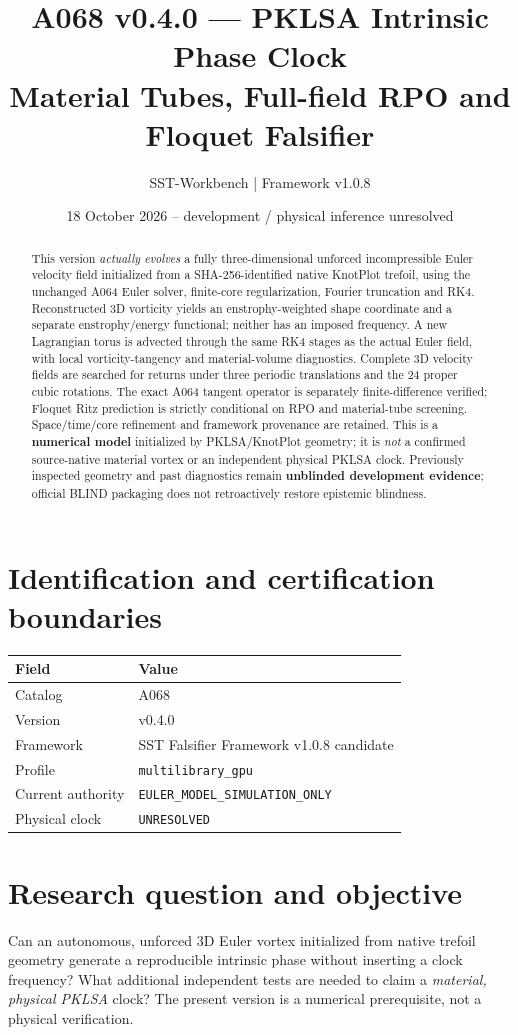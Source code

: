 \documentclass[11pt,a4paper]{article}
\title{A068 v0.4.0 --- PKLSA Intrinsic Phase Clock\\Material Tubes, Full-field RPO and Floquet Falsifier}
\author{SST-Workbench | Framework v1.0.8}
\date{18 October 2026 -- development / physical inference unresolved}
\begin{document}
\maketitle
\begin{abstract}
This version \emph{actually evolves} a fully three-dimensional unforced incompressible Euler velocity field initialized from a SHA-256-identified native KnotPlot trefoil, using the unchanged A064 Euler solver, finite-core regularization, Fourier truncation and RK4. Reconstructed 3D vorticity yields an enstrophy-weighted shape coordinate and a separate enstrophy/energy functional; neither has an imposed frequency. A new Lagrangian torus is advected through the same RK4 stages as the actual Euler field, with local vorticity-tangency and material-volume diagnostics. Complete 3D velocity fields are searched for returns under three periodic translations and the 24 proper cubic rotations. The exact A064 tangent operator is separately finite-difference verified; Floquet Ritz prediction is strictly conditional on RPO and material-tube screening. Space/time/core refinement and framework provenance are retained. This is a \textbf{numerical model} initialized by PKLSA/KnotPlot geometry; it is \emph{not} a confirmed source-native material vortex or an independent physical PKLSA clock. Previously inspected geometry and past diagnostics remain \textbf{unblinded development evidence}; official BLIND packaging does not retroactively restore epistemic blindness.
\end{abstract}

\section{Identification and certification boundaries}
\begin{tabular}{ll}
\toprule Field & Value\\\midrule
Catalog & A068\\ Version & v0.4.0\\ Framework & SST Falsifier Framework v1.0.8 candidate\\
Profile & \texttt{multilibrary\_gpu}\\ Current authority & \texttt{EULER\_MODEL\_SIMULATION\_ONLY}\\
Physical clock & \texttt{UNRESOLVED}\\ \bottomrule
\end{tabular}

\section{Research question and objective}
Can an autonomous, unforced 3D Euler vortex initialized from native trefoil geometry generate a reproducible intrinsic phase without inserting a clock frequency? What additional independent tests are needed to claim a \emph{material, physical PKLSA} clock? The present version is a numerical prerequisite, not a physical verification.
\end{document}
